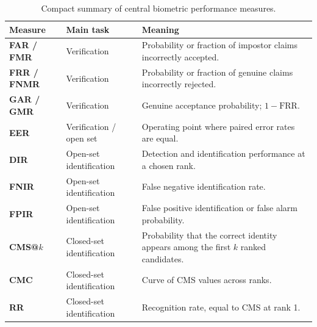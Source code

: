 \documentclass[11pt,a4paper,oneside]{report}
\begin{document}
\begin{table}[htbp]
\centering
\caption{Compact summary of central biometric performance measures.}
\label{tab:summary-metrics}
\small

\begin{tabular}{
    >{\bfseries}P{2.3cm}
    P{3.7cm}
    P{7.9cm}
}
\toprule

Measure &
\textbf{Main task} &
\textbf{Meaning}
\\

\midrule

FAR / FMR &
Verification &
Probability or fraction of impostor claims incorrectly accepted.
\\

FRR / FNMR &
Verification &
Probability or fraction of genuine claims incorrectly rejected.
\\

GAR / GMR &
Verification &
Genuine acceptance probability;
\(1-\mathrm{FRR}\).
\\

EER &
Verification / open set &
Operating point where paired error rates are equal.
\\

DIR &
Open-set identification &
Detection and identification performance at a chosen rank.
\\

FNIR &
Open-set identification &
False negative identification rate.
\\

FPIR &
Open-set identification &
False positive identification or false alarm probability.
\\

CMS@\(k\) &
Closed-set identification &
Probability that the correct identity appears among the first \(k\)
ranked candidates.
\\

CMC &
Closed-set identification &
Curve of CMS values across ranks.
\\

RR &
Closed-set identification &
Recognition rate, equal to CMS at rank 1.
\\

\bottomrule
\end{tabular}

\end{table}



\end{document}
